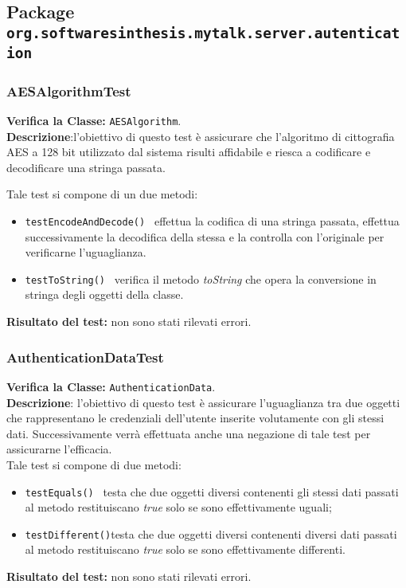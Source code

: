 \subsection{Package \texttt{org.softwaresinthesis.mytalk.server.autentication}}

\subsubsection{AESAlgorithmTest}
\textbf{Verifica la Classe:} \texttt{AESAlgorithm}.\\
\textbf{Descrizione}:l'obiettivo di questo test è assicurare che l'algoritmo di cittografia AES a 128 bit utilizzato dal sistema \caName{} risulti affidabile e riesca a codificare e decodificare una stringa passata.

Tale test si compone di un due metodi:
\begin{itemize}
\item \texttt{testEncodeAndDecode() } effettua la codifica di una stringa passata, effettua successivamente la decodifica della stessa e la controlla con l'originale per verificarne l'uguaglianza.
\item \texttt{testToString() } verifica il metodo \textit{toString} che opera la conversione in stringa degli oggetti della classe.
\end{itemize}
\textbf{Risultato del test:} non sono stati rilevati errori.

\begin{table}
\end{table}

\subsubsection{AuthenticationDataTest}
\textbf{Verifica la Classe:} \texttt{AuthenticationData}.\\
\textbf{Descrizione}: l'obiettivo di questo test è assicurare l'uguaglianza tra due oggetti che rappresentano le credenziali dell'utente inserite volutamente con gli stessi dati. Successivamente verrà effettuata anche una negazione di tale test per assicurarne l'efficacia.\\
Tale test si compone di due metodi:
\begin{itemize}
\item \texttt{testEquals() } testa che due oggetti diversi contenenti gli stessi dati passati al metodo restituiscano \textit{true} solo se sono effettivamente uguali;
\item \texttt{testDifferent()}testa che due oggetti diversi contenenti diversi dati passati al metodo restituiscano \textit{true} solo se sono effettivamente differenti.
\end{itemize}
\textbf{Risultato del test:} non sono stati rilevati errori.

